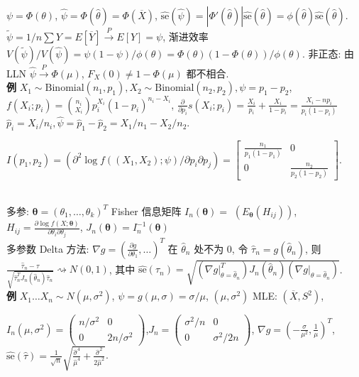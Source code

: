 \documentclass[a4paper, landscape,10pt]{article}
\begin{document}
\begin{multicols}{4}
$\psi = \Phi(\theta)$, $\hat \psi = \Phi(\hat \theta) = \Phi(\overline X)$,
$\hat{\mathrm{se}}(\hat \psi) = |\Phi'(\hat \theta)| \hat{\mathrm{se}}(\hat \theta) = \phi(\hat \theta) \hat{\mathrm{se}}(\hat \theta)$.\\
$\tilde \psi = 1/n \sum Y = E[\overline Y] \xrightarrow{P} E[Y] = \psi$, 渐进效率 $V(\tilde \psi) / V(\hat \psi) = \psi (1 - \psi) / \phi(\theta) = \Phi(\theta) (1 - \Phi(\theta)) / \phi(\theta)$. 
非正态: 由 LLN $\hat \psi \xrightarrow{P} \Phi(\mu)$, $F_X(0) \neq 1 - \Phi(\mu)$ 都不相合. \\
{\bfseries 例} $X_1 \sim \mathrm{Binomial}(n_1, p_1), X_2 \sim \mathrm{Binomial}(n_2, p_2), \psi = p_1 - p_2$,
$f(X_i; p_i) = \binom{n_i}{X_i} p_i^{X_i} (1 - p_i)^{n_i - X_i}$,
$\frac {\partial} {\partial p_i} s(X_i; p_i) = \frac {X_i} {p_i} + \frac {X_i} {1 - p_i} = \frac {X_i - n p_i } {p_i (1 - p_i)}$
$\hat p_i = X_i / n_i, \hat \psi = \hat p_1 - \hat p_2 = X_1/n_1 - X_2 / n_2$.
\begin{tiny}
$I(p_1, p_2) = (\partial ^ 2 \log f((X_1, X_2); \psi) / \partial p_i \partial p_j) = \begin{bmatrix}
	\frac{n_1}{p_1(1 - p_1)} & 0\\
	0 & \frac{n_2}{p_2(1 - p_2)}
	\end{bmatrix}. $
\end{tiny} \\
多参: $\mathbf{\theta} = (\theta_1, \dots, \theta_k)^T$ 
Fisher 信息矩阵 $I_n(\mathbf{\theta}) = $ $(E_{\mathbf{\theta}}(H_{ij}))$,
$ H_{ij} = \frac{\partial \log f(X; \mathbf{\theta})}{\partial \theta_i \partial \theta_j}$,
$J_n(\mathbf{\theta}) = I_n^{-1}(\mathbf{\theta})$\\
多参数 Delta 方法: $\nabla g = (\frac{\partial g}{\partial \theta_1}, \dots)^T$ 在 $\hat \theta_n$ 处不为 $0$, 令 $\hat \tau_n = g(\hat \theta_n)$, 则
$\frac {\hat \tau_n - \tau} {\sqrt{\hat \tau_n^T J_n(\hat \theta_n) \hat \tau_n}} \rightsquigarrow N(0, 1)$,
其中 $\hat {\mathrm{se}}(\hat \tau_n) = \sqrt{(\nabla g |_{\theta = \hat \theta_n}^T) J_n(\hat \theta_n) (\nabla g |_{\theta = \hat \theta_n})}$. \\
{\bfseries 例} $X_1\dots X_n \sim N(\mu, \sigma^2)$, $\psi = g(\mu, \sigma) = \sigma / \mu$,
$(\mu, \sigma ^ 2)$ MLE: $(\overline X, S^2)$,\begin{scriptsize}
$I_n(\mu, \sigma^2) = \begin{pmatrix}
	n / \sigma^2 & 0 \\
	0 & 2n / \sigma^2
\end{pmatrix}$,$J_n = \begin{pmatrix}
	\sigma^2 / n & 0 \\
	0 & \sigma^2 / 2n
\end{pmatrix}$, $\nabla g = (-\frac{\sigma}{\mu^2}, \frac{1}{\mu})^T$,
$\hat {\mathrm{se}}(\hat \tau) = \frac 1 {\sqrt n} \sqrt{\frac {\hat \sigma ^ 4} {\hat \mu^4} + \frac {\hat \sigma^2} {2 \hat \mu^2}}$.
\end{scriptsize} \\


\end{multicols}
\end{document}
